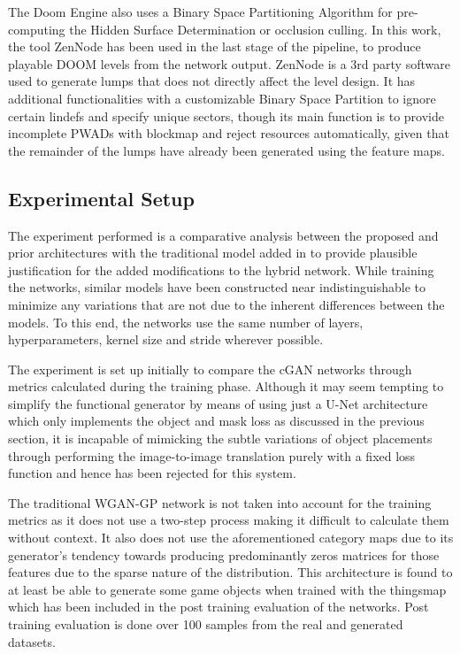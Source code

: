 \documentclass{Configuration_Files/PoliMi3i_thesis}
\begin{document}
The Doom Engine also uses a Binary Space Partitioning Algorithm for pre-computing 
the Hidden Surface Determination or occlusion culling. In this work, the 
tool ZenNode \cite{MaR04} has been used in the last stage of the pipeline, to produce playable 
DOOM levels from the network output. ZenNode is a 3rd party software used to 
generate lumps that does not directly affect the level design. It has additional 
functionalities with a customizable Binary Space Partition to ignore certain 
lindefs and specify unique sectors, though its main function is to provide 
incomplete PWADs with blockmap and reject resources automatically, given 
that the remainder of the lumps have already been generated using the feature maps.

\subsection{Experimental Setup}
The experiment performed is a comparative analysis between the proposed and prior 
architectures with the traditional model added in to provide plausible justification for 
the added modifications to the hybrid network. While training 
the networks, similar models have been constructed near indistinguishable to 
minimize any variations that are not due to the inherent differences between the 
models. To this end, the networks use the same number of layers, hyperparameters, 
kernel size and stride wherever possible. 

The experiment is set up initially to compare the cGAN networks through metrics 
calculated during the training phase. Although it may seem tempting to simplify the 
functional generator by means of using just a U-Net architecture which only implements the 
object and mask loss as discussed in the previous section, it is incapable of mimicking 
the subtle variations of object placements through performing the image-to-image 
translation purely with a fixed loss function and hence has been rejected for this system.

The traditional WGAN-GP network is not taken into account for the training metrics as it does not 
use a two-step process making it difficult to calculate them without context. It also 
does not use the aforementioned category maps due to its generator’s tendency 
towards producing predominantly zeros matrices for those features due to the sparse 
nature of the distribution. This architecture is found to at least be able to generate 
some game objects when trained with the thingsmap which has been 
included in the post training evaluation of the networks. Post training evaluation is 
done over 100 samples from the real and generated datasets.
\end{document}
